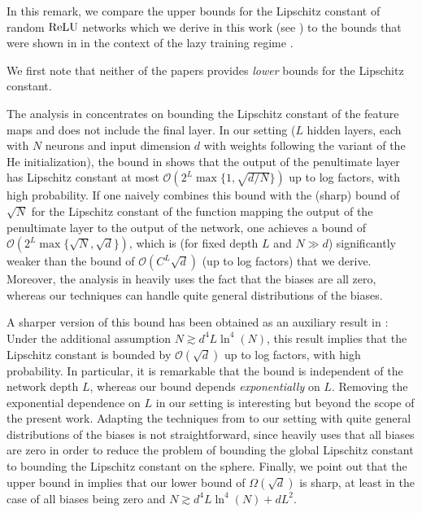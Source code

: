 \begin{remark}\label{remark:compare}
In this remark, we compare the upper bounds for the Lipschitz constant of random $\operatorname{ReLU}$
networks which we derive in this work (see )
to the bounds that were shown in \cite{buchanan2021deep,nguyen2021tight}
in the context of the lazy training regime \cite{chizat2019lazy}.

We first note that neither of the papers \cite{buchanan2021deep,nguyen2021tight}
provides \emph{lower} bounds for the Lipschitz constant.

The analysis in \cite{nguyen2021tight} concentrates on bounding the Lipschitz constant
of the feature maps and does not include the final layer.
In our setting ($L$ hidden layers, each with $N$ neurons and input dimension $d$
with weights following the variant of the He initialization),
the bound in \cite[Theorem~6.2]{nguyen2021tight} shows that the output of the penultimate layer
has Lipschitz constant at most $\mathcal{O} (2^L \max \{1, \sqrt{d/N}\})$ up to log factors,
with high probability.
If one naively combines this bound with the (sharp) bound of $\sqrt{N}$
for the Lipschitz constant of the function mapping the output of the penultimate layer
to the output of the network, one achieves a bound of $\mathcal{O}(2^L\max\{\sqrt{N}, \sqrt{d}\})$,
which is (for fixed depth $L$ and $N \gg d$) significantly weaker
than the bound of $\mathcal{O}({C^L\sqrt{d}})$ (up to log factors) that we derive.
Moreover, the analysis in \cite{nguyen2021tight} heavily uses the fact that the biases are all zero,
whereas our techniques can handle quite general distributions of the biases. 
 
A sharper version of this bound has been obtained as an auxiliary result in \cite[Theorem~B.5]{buchanan2021deep}: 
Under the additional assumption $N \gtrsim d^4L \ln^4 (N)$,
this result implies that the Lipschitz constant is bounded by $\mathcal{O}(\sqrt{d})$ up to log factors,
with high probability.
In particular, it is remarkable that the bound is independent of the network depth $L$,
whereas our bound depends \emph{exponentially} on $L$. 
Removing the exponential dependence on $L$ in our setting is interesting but beyond the scope of the present work. 
Adapting the techniques from \cite{buchanan2021deep} to our setting
with quite general distributions of the biases is not straightforward,
since \cite{buchanan2021deep} heavily uses that all biases are zero
in order to reduce the problem of bounding the global Lipschitz constant
to bounding the Lipschitz constant on the sphere.
Finally, we point out that the upper bound in \cite{buchanan2021deep} implies
that our lower bound of $\Omega(\sqrt{d})$ is sharp,
at least in the case of all biases being zero and $N \gtrsim d^4L \ln^4(N) + dL^2$.
\end{remark}
